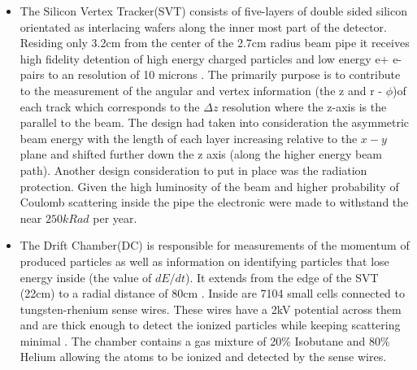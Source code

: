 \begin{itemize}
\item The Silicon Vertex Tracker(SVT) consists of five-layers of double sided silicon orientated as interlacing wafers along the inner most part of the detector. Residing only 3.2cm from the center of the 2.7cm radius beam pipe it receives  high fidelity detention of high energy charged particles and low energy e+ e- pairs to an resolution of 10 microns \cite{B14}. The primarily purpose is to contribute to the measurement of the angular and vertex information (the z  and r - $\phi$)of each track which corresponds to the $\Delta z$ resolution where the z-axis is the parallel to the beam. The design had taken into consideration the asymmetric beam energy with the length of each layer increasing relative to the $x-y$ plane and shifted further down the z axis (along the higher energy beam path). Another design consideration to put in place was the radiation protection. Given the high luminosity of the beam and higher probability of Coulomb scattering inside the pipe the electronic were made to withstand the near $250kRad$ per year.




\item The Drift Chamber(DC) is responsible for measurements of the momentum of produced particles as well as information on identifying particles that lose energy inside (the value of $dE/dt$). It extends from the edge of the SVT (22cm) to a radial distance of 80cm . Inside are 7104 small cells connected to tungsten-rhenium sense wires. These wires have a 2kV potential across them and are thick enough to detect the ionized particles while keeping scattering minimal . The chamber contains a gas mixture of 20$\%$ Isobutane and 80$\%$ Helium allowing the atoms to be ionized and detected by the sense wires. \cite{B13}





\end{itemize}
